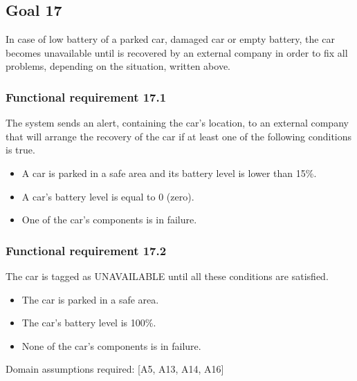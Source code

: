 \subsection{Goal 17}
In case of low battery of a parked car, damaged car or empty battery, the car becomes unavailable until is recovered by an external company in order to fix all problems, depending on the situation, written above. 

\setcounter{secnumdepth}{3}
\subsubsection{Functional requirement 17.1}
The system sends an alert, containing the car's location, to an external company that will arrange the recovery of the car if at least one of the following conditions is true.

\begin{itemize}
	\item A car is parked in a safe area and its battery level is lower than 15\%.
	\item A car's battery level is equal to 0 (zero).
	\item One of the car's components is in failure.
\end{itemize}

\subsubsection{Functional requirement 17.2}
The car is tagged as UNAVAILABLE until all these conditions are satisfied.

\begin{itemize}
	\item The car is parked in a safe area.
	\item The car's battery level is 100\%.
	\item None of the car's components is in failure.
\end{itemize}

\noindent Domain assumptions required: [A5, A13, A14, A16]

